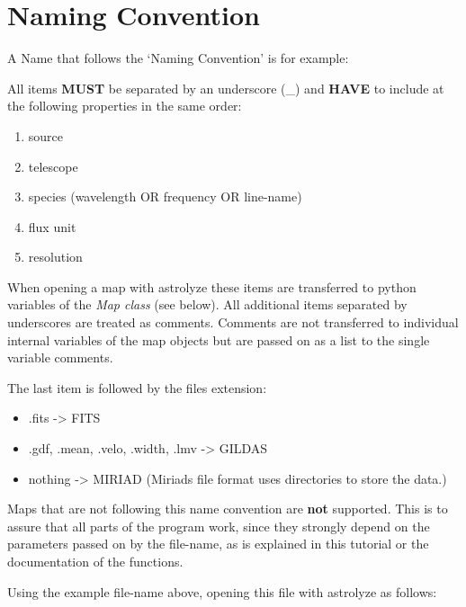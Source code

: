 \documentclass[a4paper,10pt,english]{sphinxmanual}
\begin{document}
\section{Naming Convention}
\label{manual:naming-convention}
A Name that follows the `Naming Convention' is for example:

All items \textbf{MUST} be separated by an underscore (\_) and \textbf{HAVE} to include at
the following properties in the same order:
\begin{enumerate}
\item {} 
source

\item {} 
telescope

\item {} 
species (wavelength OR frequency OR line-name)

\item {} 
flux unit

\item {} 
resolution

\end{enumerate}

When opening a map with astrolyze these items are transferred to python
variables of the \emph{Map class} (see below).  All additional items
separated by underscores are treated as comments. Comments are not
transferred to individual internal variables of the map objects but are passed
on as a list to the single variable comments.

The last item is followed by the files extension:
\begin{itemize}
\item {} 
.fits -\textgreater{} FITS

\item {} 
.gdf, .mean, .velo, .width, .lmv -\textgreater{} GILDAS

\item {} 
nothing -\textgreater{} MIRIAD (Miriads file format uses directories to store the data.)

\end{itemize}

Maps that are not following this name convention are \textbf{not} supported. This is
to assure that all parts of the program work, since they strongly depend on the
parameters passed on by the file-name, as is explained in this tutorial or the
documentation of the functions.

Using the example file-name above, opening this file with astrolyze as follows:
\end{document}
